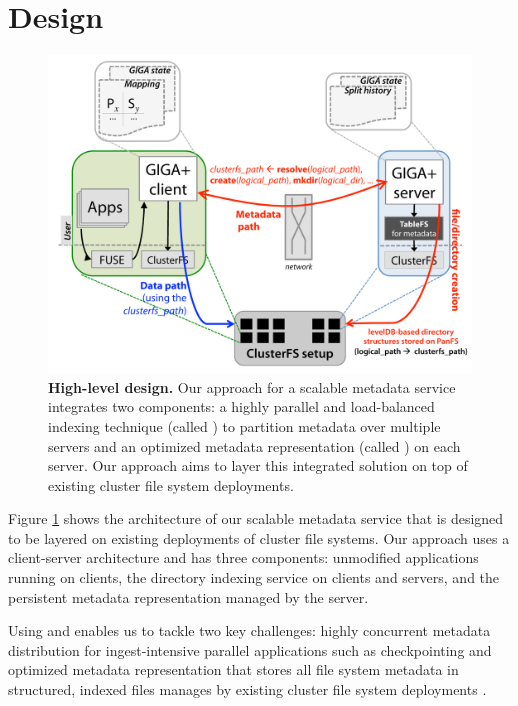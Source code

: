 \section{Design}

\begin{figure}[t]   %
\centerline{\includegraphics[scale=0.3]{./figs/giga-impl-leveldb-clusterfs}}
\caption{
\textbf{High-level design.}
{\small
Our approach for a scalable metadata service integrates two components: a highly 
parallel and load-balanced indexing technique (called \giga{} \cite{GIGA}) to 
partition
metadata over multiple servers and an optimized metadata representation (called
\tfs{} \cite{TableFS}) on each server. 
Our approach aims to layer this integrated solution on top of existing cluster file 
system deployments. 
}
}
\label{fig:design}
\end{figure}       %

Figure \ref{fig:design} shows the architecture of our scalable metadata
service that is designed to be layered on existing deployments of cluster file
systems. Our approach uses a client-server architecture and has three components: 
unmodified applications running on clients, the \giga{} directory indexing service 
on clients and servers, and the \tfs{} persistent metadata representation managed 
by the server. 

Using \giga{} and \tfs{} enables us to tackle two key challenges: highly 
concurrent metadata distribution for ingest-intensive parallel applications
such as checkpointing \cite{GIGA} and 
optimized metadata representation that stores all file system
metadata in structured, indexed files manages by existing cluster file system
deployments \cite{tablefs}. 

